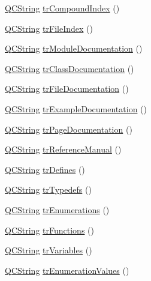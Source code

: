 \begin{DoxyCompactItemize}
\item 
\hyperlink{class_q_c_string}{Q\-C\-String} \hyperlink{class_translator_polish_a0e48e1a405822c874fe32a4de9360476}{tr\-Compound\-Index} ()
\item 
\hyperlink{class_q_c_string}{Q\-C\-String} \hyperlink{class_translator_polish_a15f2669159c8adbd33de270cb9612882}{tr\-File\-Index} ()
\item 
\hyperlink{class_q_c_string}{Q\-C\-String} \hyperlink{class_translator_polish_a574451365382668d557ed4c0063f3247}{tr\-Module\-Documentation} ()
\item 
\hyperlink{class_q_c_string}{Q\-C\-String} \hyperlink{class_translator_polish_a8353ca44fdd34652e76c88e30dd57ecf}{tr\-Class\-Documentation} ()
\item 
\hyperlink{class_q_c_string}{Q\-C\-String} \hyperlink{class_translator_polish_ad31ca23ecea4c65b74fcc709f4f7c2ae}{tr\-File\-Documentation} ()
\item 
\hyperlink{class_q_c_string}{Q\-C\-String} \hyperlink{class_translator_polish_a2d5994817321120d26ccadab25a5faf7}{tr\-Example\-Documentation} ()
\item 
\hyperlink{class_q_c_string}{Q\-C\-String} \hyperlink{class_translator_polish_a9c6f3fbd29c3bea6c7a41ba250666dec}{tr\-Page\-Documentation} ()
\item 
\hyperlink{class_q_c_string}{Q\-C\-String} \hyperlink{class_translator_polish_aea91b0be7750efb5f40a2882dec61423}{tr\-Reference\-Manual} ()
\item 
\hyperlink{class_q_c_string}{Q\-C\-String} \hyperlink{class_translator_polish_ab3f2a56beba05cd65b3f01e82833a02e}{tr\-Defines} ()
\item 
\hyperlink{class_q_c_string}{Q\-C\-String} \hyperlink{class_translator_polish_a07aff7fd650868f45400ccef334f9d58}{tr\-Typedefs} ()
\item 
\hyperlink{class_q_c_string}{Q\-C\-String} \hyperlink{class_translator_polish_afe48b3530791c5a63f53d8f169821a96}{tr\-Enumerations} ()
\item 
\hyperlink{class_q_c_string}{Q\-C\-String} \hyperlink{class_translator_polish_ae0c9871b44442dd1d31fd216cc9c2d54}{tr\-Functions} ()
\item 
\hyperlink{class_q_c_string}{Q\-C\-String} \hyperlink{class_translator_polish_a5c1a1611a3056c701987028528bceb1e}{tr\-Variables} ()
\item 
\hyperlink{class_q_c_string}{Q\-C\-String} \hyperlink{class_translator_polish_ac1f83fcaebb678320fc2286e9a89028c}{tr\-Enumeration\-Values} ()
\item 

\end{DoxyCompactItemize}
